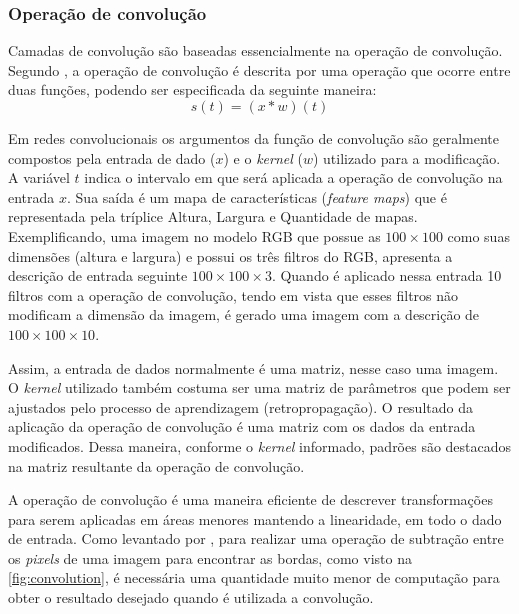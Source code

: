 \subsubsection{Operação de convolução}
Camadas de convolução são baseadas essencialmente na operação de convolução. Segundo , a operação de convolução é descrita por uma operação que ocorre entre duas funções, podendo ser especificada da seguinte maneira:\[s(t) = (x*w)(t)\] %


Em redes convolucionais os argumentos da função de convolução são geralmente compostos pela entrada de dado ($x$) e o \textit{kernel} ($w$) utilizado para a modificação. A variável $t$ indica o intervalo em que será aplicada a operação de convolução na entrada $x$. Sua saída é um mapa de características (\textit{feature maps}) que é representada pela tríplice Altura, Largura e Quantidade de mapas. Exemplificando, uma imagem no modelo RGB que possue as $100\times100$ como suas dimensões (altura e largura) e possui os três filtros do RGB, apresenta a descrição de entrada seguinte $100\times100\times3$. Quando é aplicado nessa entrada 10 filtros com a operação de convolução, tendo em vista que esses filtros não modificam a dimensão da imagem, é gerado uma imagem com a descrição de $100\times100\times10$. 

\par Assim, a entrada de dados normalmente é uma matriz, nesse caso uma imagem. O \textit{kernel} utilizado também costuma ser uma matriz de parâmetros que podem ser ajustados pelo processo de aprendizagem (retropropagação). O resultado da aplicação da operação de convolução é uma matriz com os dados da entrada modificados. Dessa maneira, conforme o \textit{kernel} informado, padrões são destacados na matriz resultante da operação de convolução.

\par A operação de convolução é uma maneira eficiente de descrever transformações para serem aplicadas em áreas menores mantendo a linearidade, em todo o dado de entrada. Como levantado por , para realizar uma operação de subtração entre os \textit{pixels} de uma imagem para encontrar as bordas, como visto na \autoref{fig:convolution}, é necessária uma quantidade muito menor de computação para obter o resultado desejado quando é utilizada a convolução.

